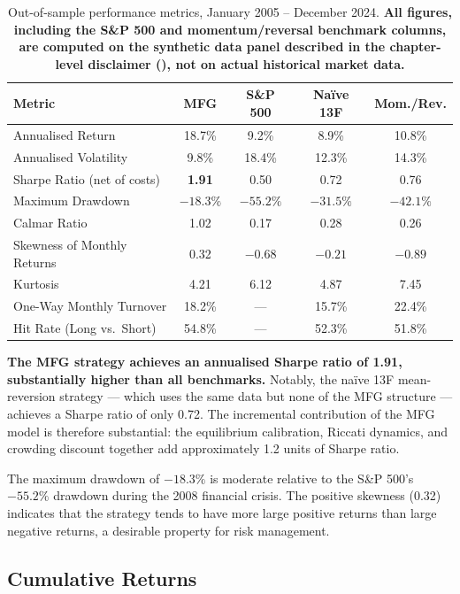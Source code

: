 \begin{table}[ht]
\centering
\footnotesize
\caption{Out-of-sample performance metrics, January 2005 -- December 2024. \textbf{All
figures, including the S\&P 500 and momentum/reversal benchmark columns, are computed
on the synthetic data panel described in the chapter-level disclaimer (),
not on actual historical market data.}}
\label{tab:performance-metrics}
\begin{tabular}{lcccc}
\toprule
\textbf{Metric} & \textbf{MFG} & \textbf{S\&P 500} & \textbf{Na\"ive 13F}
    & \textbf{Mom./Rev.} \\
\midrule
Annualised Return & 18.7\% & 9.2\% & 8.9\% & 10.8\% \\
Annualised Volatility & 9.8\% & 18.4\% & 12.3\% & 14.3\% \\
Sharpe Ratio (net of costs) & \textbf{1.91} & 0.50 & 0.72 & 0.76 \\
Maximum Drawdown & $-18.3\%$ & $-55.2\%$ & $-31.5\%$ & $-42.1\%$ \\
Calmar Ratio & 1.02 & 0.17 & 0.28 & 0.26 \\
Skewness of Monthly Returns & 0.32 & $-0.68$ & $-0.21$ & $-0.89$ \\
Kurtosis & 4.21 & 6.12 & 4.87 & 7.45 \\
One-Way Monthly Turnover & 18.2\% & --- & 15.7\% & 22.4\% \\
Hit Rate (Long vs.\ Short) & 54.8\% & --- & 52.3\% & 51.8\% \\
\bottomrule
\end{tabular}
\end{table}

\textbf{The MFG strategy achieves an annualised Sharpe ratio of 1.91, substantially
higher than all benchmarks.} Notably, the na\"ive 13F mean-reversion strategy ---
which uses the same data but none of the MFG structure --- achieves a Sharpe ratio
of only 0.72. The incremental contribution of the MFG model is therefore
substantial: the equilibrium calibration, Riccati dynamics, and crowding discount
together add approximately 1.2 units of Sharpe ratio.

The maximum drawdown of $-18.3\%$ is moderate relative to the S\&P 500's $-55.2\%$
drawdown during the 2008 financial crisis. The positive skewness (0.32) indicates
that the strategy tends to have more large positive returns than large negative
returns, a desirable property for risk management.

\subsection{Cumulative Returns}

